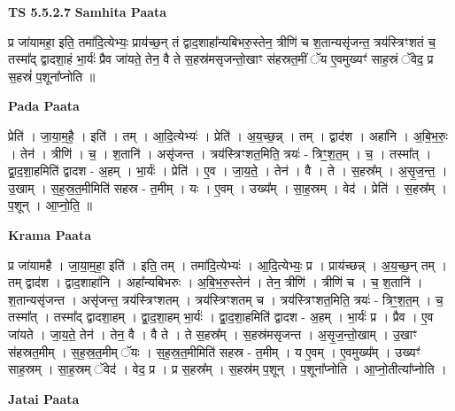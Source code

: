 \documentclass[17pt]{extarticle}
\begin{document}
\textbf{TS 5.5.2.7 } \newline
\textbf{Samhita Paata} \newline

प्र जा॑यामहा॒ इति॒ तमा॑दि॒त्येभ्यः॒ प्राय॑च्छ॒न् तं द्वाद॒शाहा᳚न्यबिभरु॒स्तेन॒ त्रीणि॑ च श॒तान्यसृ॑जन्त॒ त्रय॑स्त्रिꣳशतं च॒ तस्मा᳚द् द्वादशा॒हं भा॒र्यः॑ प्रैव जा॑यते॒ तेन॒ वै ते स॒हस्र॑मसृजन्तो॒खाꣳ स॑हस्रत॒मीं ॅय ए॒वमुख्यꣳ॑ साह॒स्रं ॅवेद॒ प्र स॒हस्रं॑ प॒शूना᳚प्नोति ॥ \newline

\textbf{Pada Paata} \newline

प्रेति॑ । जा॒या॒म॒है॒ । इति॑ । तम् । आ॒दि॒त्येभ्यः॑ । प्रेति॑ । अ॒य॒च्छ॒न्न् । तम् । द्वाद॑श । अहा॑नि । अ॒बि॒भ॒रुः॒ । तेन॑ । त्रीणि॑ । च॒ । श॒तानि॑ । असृ॑जन्त । त्रय॑स्त्रिꣳशत॒मिति॒ त्रयः॑ - त्रिꣳ॒॒श॒त॒म् । च॒ । तस्मा᳚त् । द्वा॒द॒शा॒हमिति॑ द्वादश - अ॒हम् । भा॒र्यः॑ । प्रेति॑ । ए॒व । जा॒य॒ते॒ । तेन॑ । वै । ते । स॒हस्र᳚म् । अ॒सृ॒ज॒न्त॒ । उ॒खाम् । स॒ह॒स्र॒त॒मीमिति॑ सहस्र - त॒मीम् । यः । ए॒वम् । उख्य᳚म् । सा॒ह॒स्रम् । वेद॑ । प्रेति॑ । स॒हस्र᳚म् । प॒शून् । आ॒प्नो॒ति॒ ॥  \newline


\textbf{Krama Paata} \newline

प्र जा॑यामहै । जा॒या॒म॒हा॒ इति॑ । इति॒ तम् । तमा॑दि॒त्येभ्यः॑ । आ॒दि॒त्येभ्यः॒ प्र । प्राय॑च्छन्न् । अ॒य॒च्छ॒न् तम् । तम् द्वाद॑श । द्वाद॒शाहा॑नि । अहा᳚न्यबिभरुः । अ॒बि॒भ॒रु॒स्तेन॑ । तेन॒ त्रीणि॑ । त्रीणि॑ च । च॒ श॒तानि॑ । श॒तान्यसृ॑जन्त । असृ॑जन्त॒ त्रय॑स्त्रिꣳशतम् । त्रय॑स्त्रिꣳशतम् च । त्रय॑स्त्रिꣳशत॒मिति॒ त्रयः॑ - त्रिꣳ॒॒श॒त॒म् । च॒ तस्मा᳚त् । तस्मा᳚द् द्वादशा॒हम् । द्वा॒द॒शा॒हम् भा॒र्यः॑ । द्वा॒द॒शा॒हमिति॑ द्वादश - अ॒हम् । भा॒र्यः॑ प्र । प्रैव । ए॒व जा॑यते । जा॒य॒ते॒ तेन॑ । तेन॒ वै । वै ते । ते स॒हस्र᳚म् । स॒हस्र॑मसृजन्त । अ॒सृ॒ज॒न्तो॒खाम् । उ॒खाꣳ स॑हस्रत॒मीम् । स॒ह॒स्र॒त॒मीम् ॅयः । स॒ह॒स्र॒त॒मीमिति॑ सहस्र - त॒मीम् । य ए॒वम् । ए॒वमुख्य᳚म् । उख्यꣳ॑ साह॒स्रम् । सा॒ह॒स्रम् ॅवेद॑ । वेद॒ प्र । प्र स॒हस्र᳚म् । स॒हस्र॑म् प॒शून् । प॒शूना᳚प्नोति । आ॒प्नो॒तीत्या᳚प्नोति । \newline

\textbf{Jatai Paata} \newline
\end{document}
